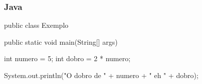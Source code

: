 
\begin{frame}[fragile]
    \frametitle{Java}
    
    \begin{java}
public class Exemplo {
    public static void main(String[] args) {
        int numero = 5;
        int dobro = 2 * numero;
        
        System.out.println("O dobro de " + numero +
                         " eh " + dobro);
    }
}
    \end{java}
\end{frame}
